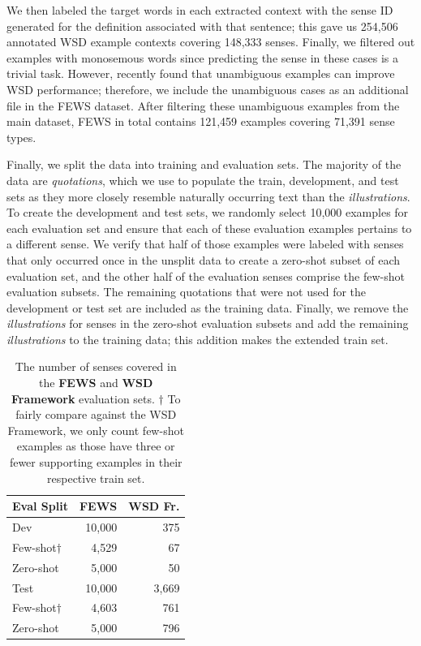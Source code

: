 \documentclass[11pt,a4paper]{article}
\begin{document}
We then labeled the target words in each extracted context with the sense ID generated for the definition associated with that sentence; this gave us 254,506 annotated WSD example contexts covering 148,333 senses. Finally, we filtered out examples with monosemous words since predicting the sense in these cases is a trivial task. However, \citet{loureiro2020neglect} recently found that unambiguous examples can improve WSD performance; therefore, we include the unambiguous cases as an additional file in the FEWS dataset. After filtering these unambiguous examples from the main dataset, FEWS in total contains 121,459 examples covering 71,391 sense types. 

Finally, we split the data into training and evaluation sets. The majority of the data are \textit{quotations}, which we use to populate the train, development, and test sets as they more closely resemble naturally occurring text than the \textit{illustrations}. To create the development and test sets, we randomly select 10,000 examples for each evaluation set and ensure that each of these evaluation examples pertains to a different sense. We verify that half of those examples were labeled with senses that only occurred once in the unsplit data to create a zero-shot subset of each evaluation set, and the other half of the evaluation senses comprise the few-shot evaluation subsets. The remaining quotations that were not used for the development or test set are included as the training data. Finally, we remove the \textit{illustrations} for senses in the zero-shot evaluation subsets and add the remaining \textit{illustrations} to the training data; this addition makes the extended train set.

\begin{table}[t]
\centering
\begin{tabular}{l|r|r}
\toprule
\textbf{Eval Split} & \textbf{FEWS} & \textbf{WSD Fr.}\\
\hline
Dev & 10,000 & 375  \\
\hspace{3mm}Few-shot$\dagger$ & 4,529 & 67 \\
\hspace{3mm}Zero-shot & 5,000 & 50 \\
\hline 
Test & 10,000 & 3,669 \\
\hspace{3mm}Few-shot$\dagger$ & 4,603 & 761 \\
\hspace{3mm}Zero-shot & 5,000 & 796 \\
\toprule
\end{tabular}
\caption{The number of senses covered in the \textbf{FEWS} and \textbf{WSD Framework} evaluation sets. $\dagger$ To fairly compare against the WSD Framework, we only count few-shot examples as those have three or fewer supporting examples in their respective train set.}
\label{eval-stats-table}
\end{table}
\end{document}
